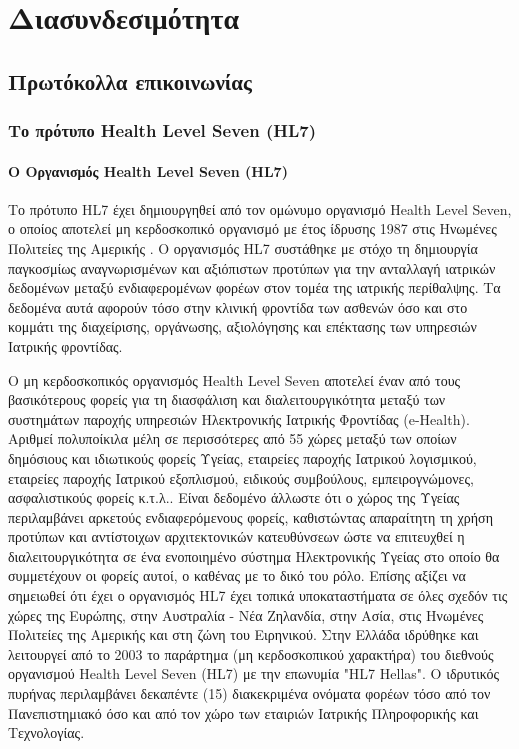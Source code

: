 \graphicspath{ {Figures/interoperability/} }
\chapter{Διασυνδεσιμότητα}\label{ch:Interoperability}
\section{Πρωτόκολλα επικοινωνίας}


	\subsection{Το πρότυπο Health Level Seven (HL7)}
		\subsubsection{Ο Οργανισμός Health Level Seven (HL7)}
		Το πρότυπο HL7 έχει δημιουργηθεί από τον ομώνυμο οργανισμό Health Level Seven, ο οποίος αποτελεί μη κερδοσκοπικό οργανισμό με έτος ίδρυσης 1987 στις Ηνωμένες Πολιτείες της Αμερικής \cite{HL7Organization}\cite{blobel2003hl7}. Ο οργανισμός HL7 συστάθηκε με στόχο τη δημιουργία παγκοσμίως αναγνωρισμένων και αξιόπιστων προτύπων για την ανταλλαγή ιατρικών δεδομένων μεταξύ ενδιαφερομένων φορέων στον τομέα της ιατρικής περίθαλψης. Τα δεδομένα αυτά αφορούν τόσο στην κλινική φροντίδα των ασθενών όσο και στο κομμάτι της διαχείρισης, οργάνωσης, αξιολόγησης και επέκτασης των υπηρεσιών Ιατρικής φροντίδας.

Ο μη κερδοσκοπικός οργανισμός Health Level Seven αποτελεί έναν από τους βασικότερους φορείς για τη διασφάλιση και διαλειτουργικότητα μεταξύ των συστημάτων παροχής υπηρεσιών Ηλεκτρονικής Ιατρικής Φροντίδας (e-Health). Αριθμεί πολυποίκιλα μέλη σε περισσότερες από 55 χώρες μεταξύ των οποίων δημόσιους και ιδιωτικούς φορείς Υγείας, εταιρείες παροχής Ιατρικού λογισμικού, εταιρείες παροχής Ιατρικού εξοπλισμού, ειδικούς συμβούλους, εμπειρογνώμονες, ασφαλιστικούς φορείς κ.τ.λ.\cite{HL7Organization}. Είναι δεδομένο άλλωστε ότι ο χώρος της Υγείας περιλαμβάνει αρκετούς ενδιαφερόμενους φορείς, καθιστώντας απαραίτητη τη χρήση προτύπων και αντίστοιχων αρχιτεκτονικών κατευθύνσεων ώστε να επιτευχθεί η διαλειτουργικότητα σε ένα ενοποιημένο σύστημα Ηλεκτρονικής Υγείας στο οποίο θα συμμετέχουν οι φορείς αυτοί, ο καθένας με το δικό του ρόλο. Επίσης αξίζει να σημειωθεί ότι έχει ο οργανισμός HL7 έχει τοπικά υποκαταστήματα σε όλες σχεδόν τις χώρες της Ευρώπης, στην Αυστραλία - Νέα Ζηλανδία, στην Ασία, στις Ηνωμένες Πολιτείες της Αμερικής και στη ζώνη του Ειρηνικού. Στην Ελλάδα ιδρύθηκε και λειτουργεί από το 2003 το παράρτημα (μη κερδοσκοπικού χαρακτήρα) του διεθνούς οργανισμού Health Level Seven (HL7) με την επωνυμία "HL7 Hellas". Ο ιδρυτικός πυρήνας περιλαμβάνει δεκαπέντε (15) διακεκριμένα ονόματα φορέων τόσο από τον Πανεπιστημιακό όσο και από τον χώρο των εταιριών Ιατρικής Πληροφορικής και Τεχνολογίας\cite{HL7Hellas}.

